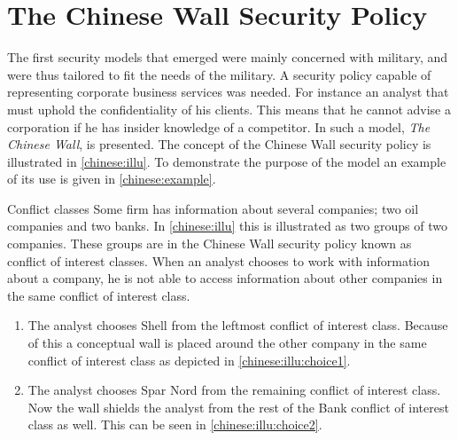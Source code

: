 \section{The Chinese Wall Security Policy}
The first security models that emerged were mainly concerned with military, and were thus tailored to fit the needs of the military.
A security policy capable of representing corporate business services was needed.
For instance an analyst that must uphold the confidentiality of his clients.
This means that he cannot advise a corporation if he has insider knowledge of a competitor.
In \citet{brewer1989chinese} such a model, \emph{The Chinese Wall}, is presented.
The concept of the Chinese Wall security policy is illustrated in \cref{chinese:illu}.
To demonstrate the purpose of the model an example of its use is given in \cref{chinese:example}.

\begin{example}{Conflict classes}\label{chinese:example}
Some firm has information about several companies; two oil companies and two banks.
In \cref{chinese:illu} this is illustrated as two groups of two companies.
These groups are in the Chinese Wall security policy known as conflict of interest classes.
When an analyst chooses to work with information about a company, he is not able to access information about other companies in the same conflict of interest class.

\begin{enumerate}
    \item The analyst chooses Shell from the leftmost conflict of interest class.
    Because of this a conceptual wall is placed around the other company in the same conflict of interest class as depicted in \cref{chinese:illu:choice1}.
    \item The analyst chooses Spar Nord from the remaining conflict of interest class.
    Now the wall shields the analyst from the rest of the Bank conflict of interest class as well.
    This can be seen in \cref{chinese:illu:choice2}.
\end{enumerate}
\end{example}

